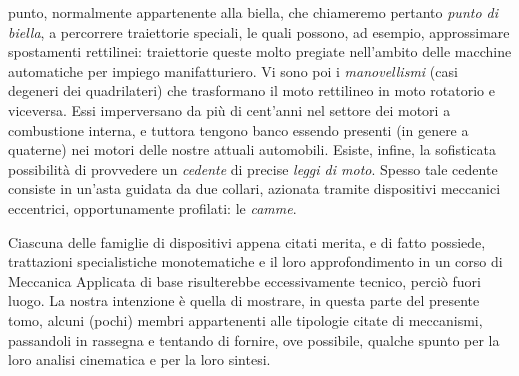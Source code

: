 punto, normalmente appartenente alla biella, che chiameremo pertanto {\em punto
di biella}, a percorrere traiettorie
speciali, le quali possono, ad esempio, approssimare
spostamenti rettilinei: traiettorie
queste molto pregiate nell'ambito delle macchine automatiche 
per impiego manifatturiero. 
Vi sono poi i {\em manovellismi} (casi degeneri dei
quadrilateri) che trasformano il moto rettilineo in  moto
rotatorio e viceversa. Essi imperversano da pi\`u di cent'anni nel
settore dei motori a combustione interna, e tuttora tengono banco essendo
presenti (in genere a quaterne) nei motori delle nostre attuali automobili.
\noindent Esiste, infine, la sofisticata possibilit\`a di
provvedere un {\em cedente} di precise
{\em leggi di moto}.
Spesso tale cedente consiste in un'asta guidata da due collari,
azionata tramite dispositivi meccanici
eccentrici, opportunamente profilati: le {\em camme}.


\noindent Ciascuna delle famiglie di dispositivi appena
citati merita, e di fatto possiede, trattazioni
specialistiche monotematiche e il loro approfondimento in un corso di Meccanica
Applicata di base risulterebbe eccessivamente tecnico, perci\`o fuori luogo.
La nostra intenzione \`e quella di mostrare, in questa parte del presente tomo,
alcuni (pochi) membri appartenenti alle tipologie citate di meccanismi,
passandoli in rassegna e tentando di fornire,
ove possibile, qualche spunto per la loro analisi cinematica e per 
la loro sintesi.






